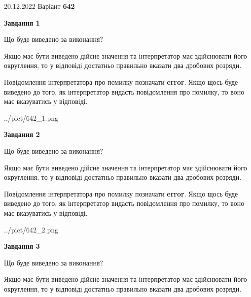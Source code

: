\documentclass[12pt, ukrainian]{article}
\begin{document}
{20.12.2022 Варіант \No \textbf { 642 }\par}
{
\begin {Large}

{\begin {center}\textbf{Завдання 1}\end {center}}\par
Що буде виведено за виконання? \par

Якщо має бути виведено дійсне значення та інтерпретатор має здійснювати його округлення, 
то у відповіді достатньо правильно вказати два дробових розряди.

Повідомлення інтерпретатора про помилку позначати \textbf{error}.
Якщо щось буде виведено до того, як інтерпретатор видасть повідомлення про помилку, 
то воно має вказуватись у відповіді. \par

\begin{center}
	{../pict/642_1.png}
\end{center}
\newpage

{\begin {center}\textbf{Завдання 2}\end {center}}\par
Що буде виведено за виконання? \par

Якщо має бути виведено дійсне значення та інтерпретатор має здійснювати його округлення, 
то у відповіді достатньо правильно вказати два дробових розряди.

Повідомлення інтерпретатора про помилку позначати \textbf{error}.
Якщо щось буде виведено до того, як інтерпретатор видасть повідомлення про помилку, 
то воно має вказуватись у відповіді. \par

\begin{center}
	{../pict/642_2.png}
\end{center}
\newpage

{\begin {center}\textbf{Завдання 3}\end {center}}\par
Що буде виведено за виконання? \par

Якщо має бути виведено дійсне значення та інтерпретатор має здійснювати його округлення, 
то у відповіді достатньо правильно вказати два дробових розряди.


\end{Large}}
\end{document}
